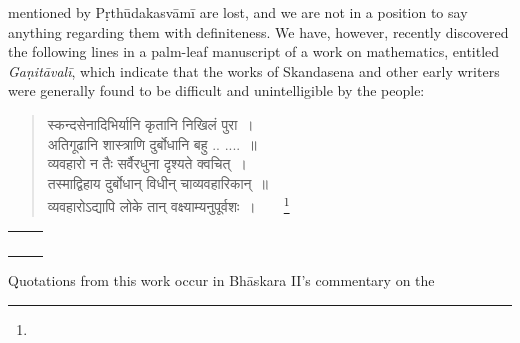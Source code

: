 \documentclass[10pt, openany]{book}
\begin{document}
{\vspace{0.3cm}{The works of the mathematicians Skandasena and others}
{mentioned by Pṛthūdakasvāmī are lost, and we are not in a}
{position to say anything regarding them with definiteness.}
{We have, however, recently discovered the following lines in a}
{palm-leaf manuscript of a work on mathematics, entitled}
{\textit{Gaṇitāvalī}, which indicate that the works of Skandasena and}
{other early writers were generally found to be difficult and}
{unintelligible by the people:}
\vspace{1mm}

\begin{quote} 
{\qt स्कन्दसेनादिभिर्यानि कृतानि निखिलं पुरा~। \\
 अतिगूढानि शास्त्राणि दुर्बोधानि बहु .. ....~॥ \\
 व्यवहारो न तैः सर्वैरधुना दृश्यते क्वचित्~। \\
 तस्माद्विहाय दुर्बोधान् विधीन् चाव्यवहारिकान्~॥ \\
 व्यवहारोऽद्यापि लोके तान् वक्ष्याम्यनुपूर्वशः~।}~~~~\renewcommand{\thefootnote}{\hspace{-4.5mm} 3}\footnote{\hspace{-2mm} }
\end{quote}

\newpage

\englishfont{}

\vspace{0.3cm}{The following works written during the eighth and ninth centuries are also now lost:}


\vspace{0.3cm}
\begin{tabular}{p{}}
~~~
\end{tabular} {Quotations \;from \;this \;work \;occur \;in \;Bhāskara \;II's}
commentary on the \\
\vspace{-4mm}

}
\end{document}

